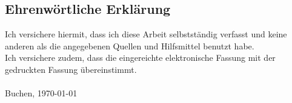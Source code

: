 \begin{titlepage}

    \chapter*{Ehrenw\"ortliche Erkl\"arung}

    \thispagestyle{empty}
    Ich versichere hiermit, dass ich diese Arbeit selbstständig verfasst und keine anderen als die angegebenen Quellen und Hilfsmittel benutzt habe. \\
    Ich versichere zudem, dass die eingereichte elektronische Fassung mit der gedruckten Fassung übereinstimmt.\\
    \\
    Buchen, \today
    \newpage
    \vspace{5mm}


\end{titlepage}
